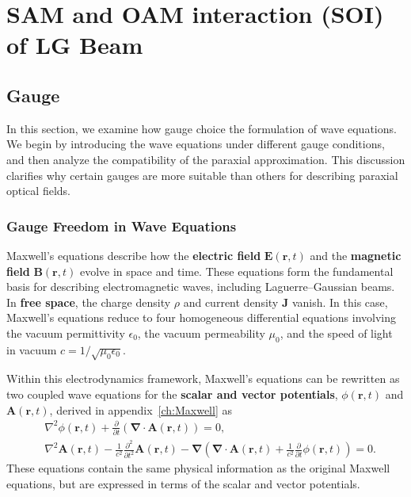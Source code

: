 \chapter{SAM and OAM interaction (SOI) of LG Beam}
\label{ch:Theory}
\section{Gauge }


In this section, we examine how gauge choice  the formulation of wave equations. We begin by introducing the wave equations under different gauge conditions, and then analyze the compatibility of the paraxial approximation. This discussion clarifies why certain gauges are more suitable than others for describing paraxial optical fields.

\subsection{Gauge Freedom in Wave Equations}

Maxwell's equations describe how the \textbf{electric field} $\boldsymbol{E}(\boldsymbol{r}, t)$ and the \textbf{magnetic field} $\boldsymbol{B}(\boldsymbol{r}, t)$ evolve in space and time. These equations form the fundamental basis for describing electromagnetic waves, including Laguerre--Gaussian beams. In \textbf{free space}, the charge density $\rho$ and current density $\mathbf{J}$ vanish. In this case, Maxwell's equations reduce to four homogeneous differential equations involving the vacuum permittivity $\epsilon_0$, the vacuum permeability $\mu_0$, and the speed of light in vacuum $c=1/\sqrt{\mu_0\epsilon_0}$. 

Within this electrodynamics framework, Maxwell's equations can be rewritten as two coupled wave equations for the \textbf{scalar and vector potentials}, $\phi(\boldsymbol{r}, t)$ and $\boldsymbol{A}(\boldsymbol{r}, t)$, derived in appendix~\ref{ch:Maxwell} as
\begin{align} 
&\nabla^2\phi(\boldsymbol{r}, t)+\frac{\partial }{\partial t}\left(\boldsymbol{\nabla}\cdot\boldsymbol{A}(\boldsymbol{r}, t)\right)=0, \label{max5} \\
&\nabla^2\boldsymbol{A}(\boldsymbol{r}, t)-\frac{1}{c^2}\frac{\partial^2 }{\partial t^2}\boldsymbol{A}(\boldsymbol{r}, t)-\boldsymbol{\nabla}\left(\boldsymbol{\nabla}\cdot\boldsymbol{A}(\boldsymbol{r}, t)+\frac{1}{c^2}\frac{\partial }{\partial t}\phi(\boldsymbol{r}, t)\right)=0. \label{max6}
\end{align}
These equations contain the same physical information as the original Maxwell equations, but are expressed in terms of the scalar and vector potentials.


